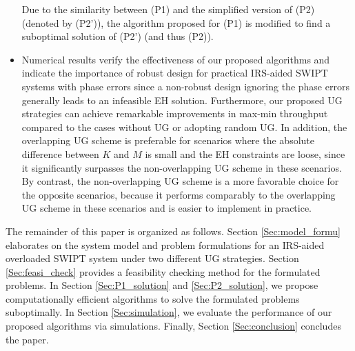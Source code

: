 \documentclass[12pt,draftclsnofoot, onecolumn]{IEEEtran}
\theoremstyle{plain}
\begin{document}
\begin{sloppypar}
\begin{itemize}
	Due to the similarity between (P1) and the simplified version of (P2) (denoted by (P2')), the algorithm proposed for (P1) is modified to find a suboptimal solution of (P2') (and thus (P2)). 
	\item Numerical results verify the effectiveness of our proposed algorithms and indicate the importance of robust design for practical IRS-aided SWIPT systems with phase errors since a non-robust design ignoring the phase errors generally leads to an infeasible EH solution. Furthermore, our proposed UG strategies can achieve remarkable improvements in max-min throughput compared to the cases without UG or adopting random UG. %
	In addition, the overlapping UG scheme is  preferable for scenarios where the absolute difference between $K$ and $M$ is small and the EH constraints are loose, since it significantly surpasses the non-overlapping UG scheme in these scenarios. By contrast, the non-overlapping UG scheme is a more favorable choice for the opposite scenarios, because it performs comparably to the overlapping UG scheme in these scenarios and is easier to implement in practice.   
\end{itemize} 

The remainder of this paper is organized as follows. Section \ref{Sec:model_formu} elaborates on the system model and problem formulations for an IRS-aided overloaded SWIPT system under two different UG strategies. Section \ref{Sec:feasi_check} provides a feasibility checking method for the formulated problems. In Section \ref{Sec:P1_solution} and \ref{Sec:P2_solution}, we propose computationally efficient algorithms to solve the formulated problems suboptimally. In Section \ref{Sec:simulation}, we evaluate the performance of our proposed algorithms via simulations. Finally, Section \ref{Sec:conclusion} concludes the paper.  


\end{sloppypar}
\end{document}
